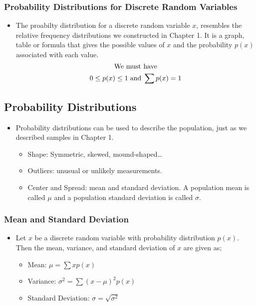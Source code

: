 \documentclass[12pt, letterpaper]{article}
\begin{document}
            \subsubsection{Probability Distributions for Discrete Random Variables}
                \begin{itemize}
                    \item The proabilty distribution for a discrete random variable $x$, resembles the relative frequency distributions we constructed in Chapter 1. It is a graph, table or formula that gives the possible values of $x$ and the probability $p(x)$ associated with each value. $$ \textnormal{We must have}$$ $$0 \leq p(x) \leq 1 \hspace{1mm} \textnormal{and} \hspace{1mm} \sum p(x) = 1$$
                \end{itemize}
        \subsection{Probability Distributions}
            \begin{itemize}
                \item Probability distributions can be used to describe the population, just as we described samples in Chapter 1.
                \begin{itemize}
                    \item Shape: Symmetric, skewed, mound-shaped\dots
                    \item Outliers: unusual or unlikely measurements.
                    \item Center and Spread: mean and standard deviation. A population mean is called $\mu$ and a population standard deviation is called $\sigma$. 
                \end{itemize}
            \end{itemize}
            \subsubsection{Mean and Standard Deviation}
                \begin{itemize}
                    \item Let $x$ be a discrete random variable with probability distribution $p(x)$. Then the mean, variance, and standard deviation of $x$ are given as; \smallskip
                    \begin{itemize}
                        \item Mean: $\mu = \sum xp(x)$
                        \item Variance: $\sigma ^2 = \sum (x - \mu)^2 p(x)$
                        \item Standard Deviation: $\sigma = \sqrt{\sigma ^2}$
                    \end{itemize}
                \end{itemize}
\end{document}
